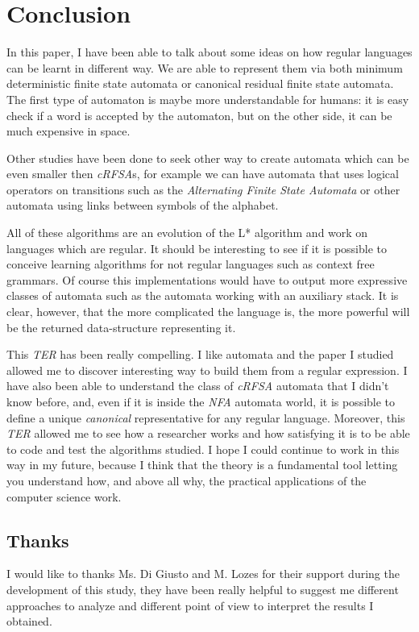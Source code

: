 \section{Conclusion}

In this paper, I have been able to talk about some ideas on how regular languages can be learnt in different way. We are able to represent them via both minimum deterministic finite state automata or canonical residual finite state automata. The first type of automaton is maybe more understandable for humans: it is easy check if a word is accepted by the automaton, but on the other side, it can be much expensive in space.

Other studies have been done to seek other way to create automata which can be even smaller then \textit{cRFSA}s, for example we can have automata that uses logical operators on transitions such as the \textit{Alternating Finite State Automata} or other automata using links between symbols of the alphabet.

All of these algorithms are an evolution of the L* algorithm and work on languages which are regular. It should be interesting to see if it is possible to conceive learning algorithms for not regular languages such as context free grammars. Of course this implementations would have to output more expressive classes of automata such as the automata working with an auxiliary stack. It is clear, however, that the more complicated the language is, the more powerful will be the returned data-structure representing it.

This \textit{TER} has been really compelling. I like automata and the paper I studied allowed me to discover interesting way to build them from a regular expression. I have also been able to understand the class of \textit{cRFSA} automata that I didn't know before, and, even if it is inside the \textit{NFA} automata world, it is possible to define a unique \textit{canonical} representative for any regular language. Moreover, this \textit{TER} allowed me to see how a researcher works and how satisfying it is to be able to code and test the algorithms studied. I hope I could continue to work in this way in my future, because I think that the theory is a fundamental tool letting you understand how, and above all why, the practical applications of the computer science work.


\subsection{Thanks}
I would like to thanks Ms. Di Giusto and M. Lozes for their support during the development of this study, they have been really helpful to suggest me different approaches to analyze and different point of view to interpret the results I obtained.